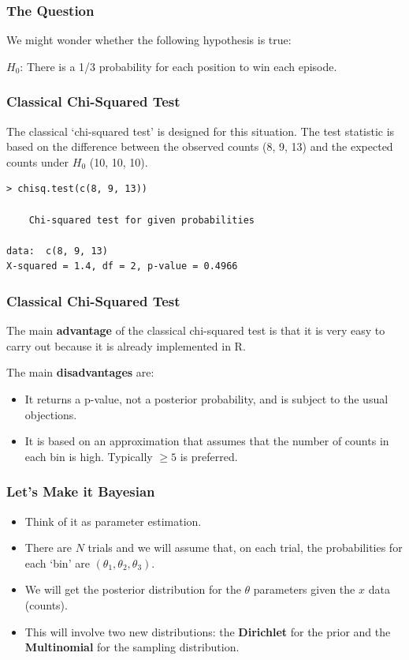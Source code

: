 \documentclass{beamer}
\begin{document}
\begin{frame}
\frametitle{The Question}
We might wonder whether the following hypothesis is true:\\[0.5em]\pause

$H_0$: There is a 1/3 probability for each position to win each episode.

\end{frame}

\begin{frame}[fragile]
\frametitle{Classical Chi-Squared Test}
The classical `chi-squared test' is designed for this situation.
The test statistic is based on the difference between the observed counts
(8, 9, 13) and the expected counts under $H_0$ (10, 10, 10).
\pause
\begin{verbatim}
> chisq.test(c(8, 9, 13))

	Chi-squared test for given probabilities

data:  c(8, 9, 13)
X-squared = 1.4, df = 2, p-value = 0.4966
\end{verbatim}

\end{frame}

\begin{frame}[fragile]
\frametitle{Classical Chi-Squared Test}
The main {\bf advantage} of the classical chi-squared test is that it is very
easy to carry out because it is already implemented in R.\\[0.5em]\pause

The main {\bf disadvantages} are:\pause
\begin{itemize}
\item It returns a p-value, not a posterior probability, and is subject to the
usual objections.\pause
\item It is based on an approximation that assumes that the number of counts
in each bin is high. Typically $\geq 5$ is preferred.
\end{itemize}

\end{frame}


\begin{frame}
\frametitle{Let's Make it Bayesian}
\begin{itemize}
\item Think of it as parameter estimation.\pause
\item There are $N$ trials and we will assume that, on each trial, the
probabilities for each `bin' are $(\theta_1, \theta_2, \theta_3)$.\pause
\item We will get the posterior distribution for the $\theta$ parameters
given the $x$ data (counts).\pause
\item This will involve two new distributions: the {\bf Dirichlet} for the
prior and the {\bf Multinomial} for the sampling distribution.
\end{itemize}

\end{frame}
\end{document}
